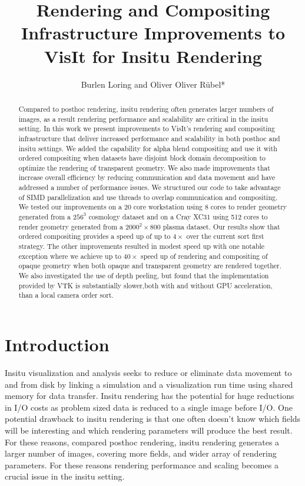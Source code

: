 \documentclass[a4paper,10pt]{report}
\title{Rendering and Compositing Infrastructure Improvements to VisIt for Insitu Rendering}
\author{Burlen Loring and Oliver Oliver R\"ubel*}
\begin{document}
\maketitle

\begin{abstract}
Compared to posthoc rendering, insitu rendering often generates larger numbers of images, as a result rendering performance and scalability are critical in the insitu setting. In this work we present improvements to VisIt's rendering and compositing infrastructure that deliver increased performance and scalability in both posthoc and insitu settings. We added the capability for alpha blend compositing and use it with ordered compositing when datasets have disjoint block domain decomposition to optimize the rendering of transparent geometry. We also made improvements that increase overall efficiency by reducing communication and data movement and have addressed a number of performance issues. We structured our code to take advantage of SIMD parallelization and use threads to overlap communication and compositing. We tested our improvements on a 20 core workstation using 8 cores to render geometry generated from a $256^3$ cosmology dataset and on a Cray XC31 using 512 cores to render geometry generated from a $2000^2 \times 800$ plasma dataset. Our results show that ordered compositing provides a speed up of up to $4 \times$ over the current sort first strategy. The other improvements resulted in modest speed up with one notable exception where we achieve up to $40 \times$ speed up of rendering and compositing of opaque geometry when both opaque and transparent geometry are rendered together. We also investigated the use of depth peeling, but found that the implementation provided by VTK is substantially slower,both with and without GPU acceleration, than a local camera order sort.
\end{abstract}

\section{Introduction}
Insitu visualization and analysis seeks to reduce or eliminate data movement to and from disk by linking a simulation and a visualization run time using shared memory for data transfer. Insitu rendering has the potential for huge reductions in I/O costs as problem sized data is reduced to a single image before I/O. One potential drawback to insitu rendering is that one often doesn't know which fields will be interesting and which rendering parameters will produce the best result. For these reasons, compared posthoc rendering, insitu rendering generates a larger number of images, covering more fields, and wider array of rendering parameters. For these reasons rendering performance and scaling becomes a crucial issue in the insitu setting.
\end{document}
